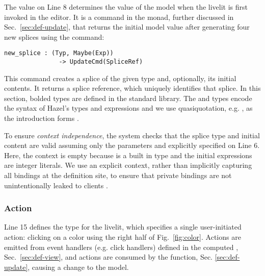 The  value on Line 8 determines the value of the model
when the livelit is first invoked in the editor.
It is a command in the  monad, further discussed in Sec.~\ref{sec:def-update}, that returns the 
initial model value after generating four new splices 
using the  command:
\begin{lstlisting}[numbers=none]
  new_splice : (Typ, Maybe(Exp)) 
               -> UpdateCmd(SpliceRef)
\end{lstlisting}
This command creates a splice
of the given type and, optionally, its initial contents. 
It returns a splice reference, which uniquely identifies that splice.
In this section, bolded types  
are defined in the standard library. The  and  types 
encode the syntax of Hazel's types and expressions 
and we use quasiquotation, e.g. , as the introduction forms \cite{bawden1999quasiquotation}. 

To ensure \emph{context independence}, 
the system checks that the splice type and initial content are valid 
assuming only the parameters and explicitly specified  on Line 6.
Here, the context is empty because  is a built in type
and the initial expressions are integer literals. 
We use an explicit context, rather than implicitly capturing all bindings 
at the definition site, 
to ensure that private bindings are not unintentionally  
leaked to clients \cite{TLMs}.

\subsubsection{Action}
Line 15 defines the  type for the  livelit, which 
specifies a single user-initiated action: clicking on a color using
the right half of Fig.~\ref{fig:color}. Actions are emitted
from event handlers (e.g. click handlers) defined in the computed , Sec.~\ref{sec:def-view}, 
and actions are consumed by the  function, Sec. \ref{sec:def-update}, causing a change to the model.

